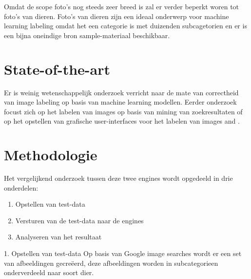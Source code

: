Omdat de scope foto's nog steeds zeer breed is zal er verder beperkt woren tot foto's van dieren. Foto's van dieren zijn een ideaal onderwerp voor machine learning labeling omdat het een categorie is met duizenden subcagetorien en er is een bijna oneindige bron sample-materiaal beschikbaar.



\section{State-of-the-art}
\label{sec:state-of-the-art}

Er is weinig wetenschappelijk onderzoek verricht naar de mate van correctheid van image labeling op basis van machine learning modellen. Eerder onderzoek focust zich op het labelen van images op basis van mining van zoekresultaten \autocite{Wang2008} of op het opstellen van grafische user-interfaces voor het labelen van images \autocite{LuisvonAhn2004} and \autocite{JuliaMoehrmann2012}.







\section{Methodologie}
\label{sec:methodologie}

Het vergelijkend onderzoek tussen deze twee engines wordt opgedeeld in drie onderdelen:

\begin{enumerate}
    \item Opstellen van test-data
    \item Versturen van de test-data naar de engines
    \item Analyseren van het resultaat
\end{enumerate}

1. Opstellen van test-data
\linebreak
Op basis van Google image searches wordt er een set van afbeeldingen gecreëerd, deze afbeeldingen worden in subcategorieen onderverdeeld naar soort dier.


